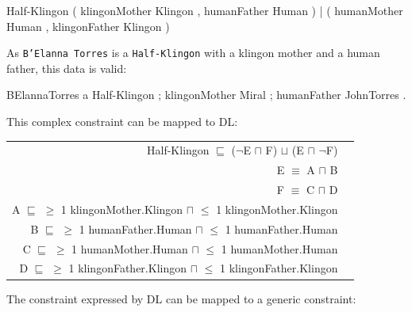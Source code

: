 \documentclass{llncs}
\newcommand{\ms}[1]{\texttt{#1}}
\newenvironment{DL}{
	\begin{center}
  \begin{tabular}{r l}

}{
  \end{tabular}
	\end{center}
}
\begin{document}
\begin{ex}
Half-Klingon { 
    ( klingonMother Klingon , humanFather Human ) |
    ( humanMother Human , klingonFather Klingon ) }
\end{ex}

As \ms{B'Elanna Torres} is a \ms{Half-Klingon} with a klingon mother and a human father, this data is valid:

\begin{ex}
BElannaTorres a Half-Klingon ;
    klingonMother Miral ; humanFather JohnTorres .
\end{ex}


This complex constraint can be mapped to DL:

\begin{DL}
Half-Klingon $\sqsubseteq$ ($\neg$E $\sqcap$ F) $\sqcup$ (E $\sqcap$ $\neg$F) \\ 
E $\equiv$ A $\sqcap$ B \\
F $\equiv$ C $\sqcap$ D \\
A $\sqsubseteq$ $\geq$ 1 klingonMother.Klingon $\sqcap$ $\leq$ 1 klingonMother.Klingon \\
B $\sqsubseteq$ $\geq$ 1 humanFather.Human $\sqcap$ $\leq$ 1 humanFather.Human \\
C $\sqsubseteq$ $\geq$ 1 humanMother.Human $\sqcap$ $\leq$ 1 humanMother.Human \\
D $\sqsubseteq$ $\geq$ 1 klingonFather.Klingon $\sqcap$ $\leq$ 1 klingonFather.Klingon \\
\end{DL}

The constraint expressed by DL can be mapped to a generic constraint:
\end{document}
